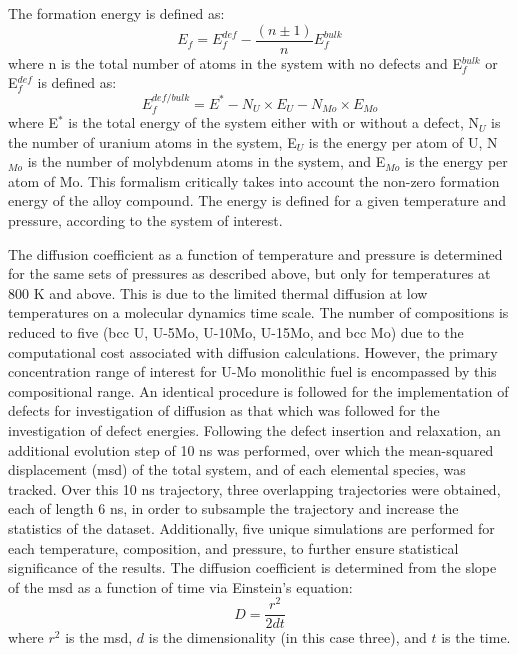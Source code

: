\documentclass[default]{sn-jnl}%
\begin{document}
The formation energy is defined as:
\begin{equation}
 E_f= E_f^{def} -  \frac{(n\pm1)}{n}E_f^{bulk}
\end{equation}
\noindent where n is the total number of atoms in the system with no defects and E$_f^{bulk}$ or E$_f^{def}$ is defined as:
\begin{equation}
E_f^{def/bulk}= E^*- N_U \times E_U - N_{Mo} \times E_{Mo} 
\end{equation}
\noindent where E$^*$ is the total energy of the system either with or without a defect, N$_U$ is the number of uranium atoms in the system, E$_U$ is the energy per atom of U, N$_{Mo}$ is the number of molybdenum atoms in the system, and E$_{Mo}$ is the energy per atom of Mo. This formalism critically takes into account the non-zero formation energy of the alloy compound. The energy is defined for a given temperature and pressure, according to the system of interest. 

The diffusion coefficient as a function of temperature and pressure is determined for the same sets of pressures as described above, but only for temperatures at 800 K and above. This is due to the limited thermal diffusion at low temperatures on a molecular dynamics time scale. The number of compositions is reduced to five (bcc U, U-5Mo, U-10Mo, U-15Mo, and bcc Mo) due to the computational cost associated with diffusion calculations. However, the primary concentration range of interest for U-Mo monolithic fuel is encompassed by this compositional range. An identical procedure is followed for the implementation of defects for investigation of diffusion as that which was followed for the investigation of defect energies. Following the defect insertion and relaxation, an additional evolution step of 10 ns was performed, over which the mean-squared displacement (msd) of the total system, and of each elemental species, was tracked. Over this 10 ns trajectory, three overlapping trajectories were obtained, each of length 6 ns, in order to subsample the trajectory and increase the statistics of the dataset. Additionally, five unique simulations are performed for each temperature, composition, and pressure, to further ensure statistical significance of the results. The diffusion coefficient is determined from the slope of the msd as a function of time via Einstein's equation:
\begin{equation}
D = \frac{r^2}{2dt} 
\end{equation}
\noindent where $r^2$ is the msd, $d$ is the dimensionality (in this case three), and $t$ is the time. 
\end{document}
